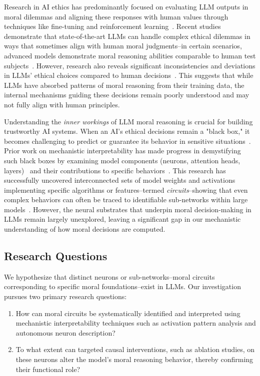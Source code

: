 \documentclass[runninghheads]{llncs}
\begin{document}
Research in AI ethics has predominantly focused on evaluating LLM outputs in moral dilemmas and aligning these responses with human values through techniques like fine-tuning and reinforcement learning~\cite{Rao2023}.
Recent studies demonstrate that state-of-the-art LLMs can handle complex ethical dilemmas in ways that sometimes align with human moral judgments--in certain scenarios, advanced models demonstrate moral reasoning abilities comparable to human test subjects~\cite{Tanmay2023}.
However, research also reveals significant inconsistencies and deviations in LLMs' ethical choices compared to human decisions~\cite{Takemoto2024}.
This suggests that while LLMs have absorbed patterns of moral reasoning from their training data, the internal mechanisms guiding these decisions remain poorly understood and may not fully align with human principles.

Understanding the \emph{inner workings} of LLM moral reasoning is crucial for building trustworthy AI systems.
When an AI's ethical decisions remain a "black box," it becomes challenging to predict or guarantee its behavior in sensitive situations~\cite{Templeton2024}.
Prior work on mechanistic interpretability has made progress in demystifying such black boxes by examining model components (neurons, attention heads, layers)~\cite{olah_building_2018,bereska_mechanistic_2024} and their contributions to specific behaviors~\cite{Tlaie2024}.
This research has successfully uncovered interconnected sets of model weights and activations implementing specific algorithms or features--termed \emph{circuits}--showing that even complex behaviors can often be traced to identifiable sub-networks within large models~\cite{Stolfo2023}.
However, the neural substrates that underpin moral decision-making in LLMs remain largely unexplored, leaving a significant gap in our mechanistic understanding of how moral decisions are computed.

\subsection{Research Questions}

We hypothesize that distinct neurons or sub-networks--moral circuits corresponding to specific moral foundations--exist in LLMs. Our investigation pursues two primary research questions:

\begin{enumerate}
    \item How can moral circuits be systematically identified and interpreted using mechanistic interpretability techniques such as activation pattern analysis and autonomous neuron description?
    \item To what extent can targeted causal interventions, such as ablation studies, on these neurons alter the model's moral reasoning behavior, thereby confirming their functional role?
\end{enumerate}
\end{document}
